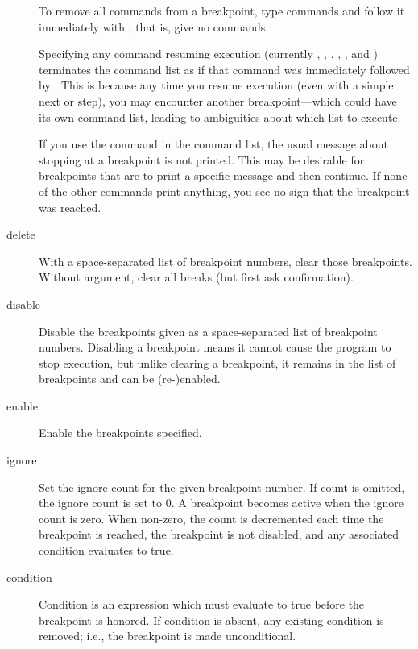 \begin{description}
To remove all commands from a breakpoint, type commands and
follow it immediately with ; that is, give no commands.

Specifying any command resuming execution (currently ,
, , , , and )
terminates the command list as if that command was immediately
followed by .  This is because any time you resume execution
(even with a simple next or step), you may encounter another
breakpoint---which could have its own command list, leading to
ambiguities about which list to execute.

If you use the  command in the command list, the
usual message about stopping at a breakpoint is not printed.
This may be desirable for breakpoints that are to print a
specific message and then continue.  If none of the other
commands print anything, you see no sign that the breakpoint
was reached.

\item[delete \optional{\var{bpnumber} \optional{\var{bpnumber \ldots}}}]

With a space-separated list of breakpoint numbers, clear those
breakpoints.  Without argument, clear all breaks (but first
ask confirmation).

\item[disable \optional{\var{bpnumber} \optional{\var{bpnumber \ldots}}}]

Disable the breakpoints given as a space-separated list of
breakpoint numbers.  Disabling a breakpoint means it cannot cause
the program to stop execution, but unlike clearing a breakpoint, it
remains in the list of breakpoints and can be (re-)enabled.

\item[enable \optional{\var{bpnumber} \optional{\var{bpnumber \ldots}}}]

Enable the breakpoints specified.

\item[ignore \var{bpnumber} \optional{\var{count}}]

Set the ignore count for the given breakpoint number.  If count is
omitted, the ignore count is set to 0.  A breakpoint becomes active
when the ignore count is zero.  When non-zero, the count is
decremented each time the breakpoint is reached, the breakpoint is not
disabled, and any associated condition evaluates to true.

\item[condition \var{bpnumber} \optional{\var{condition}}]

Condition is an expression which must evaluate to true before
the breakpoint is honored.  If condition is absent, any existing
condition is removed; i.e., the breakpoint is made unconditional.

\end{description}

